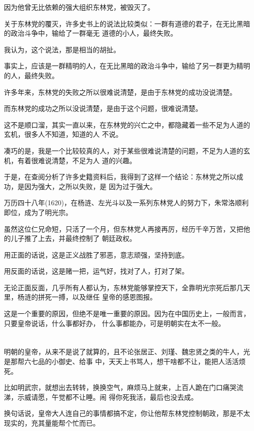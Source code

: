 \documentclass[11pt,a4paper,onecolumn]{article}
\begin{document}
因为他曾无比依赖的强大组织东林党，被毁灭了。

关于东林党的覆灭，许多史书上的说法比较类似：一群有道德的君子，在无比黑暗的政治斗争中，输给了一群毫无
道德的小人，最终失败。

我认为，这个说法，那是相当的胡扯。

事实上，应该是一群精明的人，在无比黑暗的政治斗争中，输给了另一群更为精明的人，最终失败。

许多年来，东林党的失败之所以很难说清楚，是由于东林党的成功没说清楚。

而东林党的成功之所以没说清楚，是由于这个问题，很难说清楚。

这不是顺口溜，其实一直以来，在东林党的兴亡之中，都隐藏着一些不足为人道的玄机，很多人不知道，知道的人
不说。

凑巧的是，我是一个比较较真的人，对于某些很难说清楚的问题，不足为人道的玄机，有着很难说清楚，不足为人
道的兴趣。

于是，在查阅分析了许多史籍资料后，我得到了这样一个结论：东林党之所以成功，是因为强大，之所以失败，是
因为过于强大。

万历四十八年(1620)，在杨涟、左光斗以及一系列东林党人的努力下，朱常洛顺利即位，成为了明光宗。

虽然这位仁兄命短，只活了一个月，但东林党人再接再厉，经历千辛万苦，又把他的儿子推了上去，并最终控制了
朝廷政权。

用正面的话说，这是正义战胜了邪恶，意志顽强，坚持到底。

用反面的话说，这是赌一把，运气好，找对了人，打对了架。

无论正面反面，几乎所有人都认为，东林党能够掌控天下，全靠明光宗死后那几天里，杨涟的拼死一搏，以及继任
皇帝的感恩图报。

这是一个重要的原因，但绝不是唯一重要的原因。因为在中国历史上，一般而言，只要皇帝说话，什么事都好办，
什么事都能办，可是明朝实在太不一般。

\section[\thesection]{}

明朝的皇帝，从来不是说了就算的，且不论张居正、刘瑾、魏忠贤之类的牛人，光是那帮六七品的小御史、给事
中，天天上书骂人，想干啥都不让，能把人活活烦死。

比如明武宗，就想出去转转，换换空气，麻烦马上就来，上百人跪在门口痛哭流涕，示威请愿，午觉都不让睡。闹
得你死我活，最后也没去成。

换句话说，皇帝大人连自己的事情都搞不定，你让他帮东林党控制朝政，那是不太现实的，充其量能帮个忙而已。
\end{document}
